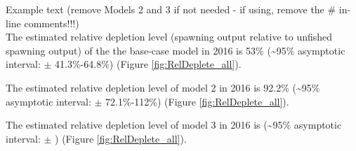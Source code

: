 \documentclass[12pt,]{article}
\begin{document}
Example text (remove Models 2 and 3 if not needed - if using, remove the
\# in-line comments!!!)\\
The estimated relative depletion level (spawning output relative to
unfished spawning output) of the the base-case model in 2016 is 53\%
(\textasciitilde{}95\% asymptotic interval: \(\pm\) 41.3\%-64.8\%)
(Figure \ref{fig:RelDeplete_all}).

The estimated relative depletion level of model 2 in 2016 is 92.2\%
(\textasciitilde{}95\% asymptotic interval: \(\pm\) 72.1\%-112\%)
(Figure \ref{fig:RelDeplete_all}).

The estimated relative depletion level of model 3 in 2016 is
(\textasciitilde{}95\% asymptotic interval: \(\pm\) ) (Figure
\ref{fig:RelDeplete_all}).

\FloatBarrier
\end{document}
